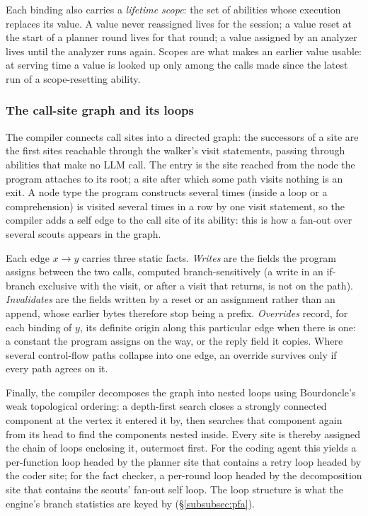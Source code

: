 Each binding also carries a \emph{lifetime scope}: the set of abilities whose execution replaces its value. A value never reassigned lives for the session; a value reset at the start of a planner round lives for that round; a value assigned by an analyzer lives until the analyzer runs again. Scopes are what makes an earlier value usable: at serving time a value is looked up only among the calls made since the latest run of a scope-resetting ability.

\subsubsection{The call-site graph and its loops}
\label{subsubsec:graph}
The compiler connects call sites into a directed graph: the successors of a site are the first sites reachable through the walker's visit statements, passing through abilities that make no LLM call. The entry is the site reached from the node the program attaches to its root; a site after which some path visits nothing is an exit. A node type the program constructs several times (inside a loop or a comprehension) is visited several times in a row by one visit statement, so the compiler adds a self edge to the call site of its ability: this is how a fan-out over several scouts appears in the graph.

Each edge $x\to y$ carries three static facts. \emph{Writes} are the fields the program assigns between the two calls, computed branch-sensitively (a write in an if-branch exclusive with the visit, or after a visit that returns, is not on the path). \emph{Invalidates} are the fields written by a reset or an assignment rather than an append, whose earlier bytes therefore stop being a prefix. \emph{Overrides} record, for each binding of $y$, its definite origin along this particular edge when there is one: a constant the program assigns on the way, or the reply field it copies. Where several control-flow paths collapse into one edge, an override survives only if every path agrees on it.

Finally, the compiler decomposes the graph into nested loops using Bourdoncle's weak topological ordering: a depth-first search closes a strongly connected component at the vertex it entered it by, then searches that component again from its head to find the components nested inside. Every site is thereby assigned the chain of loops enclosing it, outermost first. For the coding agent this yields a per-function loop headed by the planner site that contains a retry loop headed by the coder site; for the fact checker, a per-round loop headed by the decomposition site that contains the scouts' fan-out self loop. The loop structure is what the engine's branch statistics are keyed by (\S\ref{subsubsec:pfa}).

